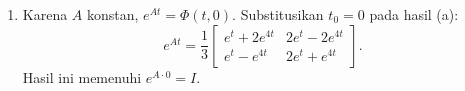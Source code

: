 \documentclass[11pt,a4paper]{article}
\begin{document}
\begin{enumerate}[itemsep=12pt,parsep=5pt]
\begin{enumerate}
                Untuk waktu awal $t_0$, matriks transisinya adalah
                \begin{align*}
                  \Phi(t,t_0)
                    &=F(t)F(t_0)^{-1}\\
                    &=P\begin{bmatrix}e^{t-t_0}&0\\0&e^{4(t-t_0)}\end{bmatrix}P^{-1}.
                \end{align*}
                Tuliskan $\Delta=t-t_0$.
                Setelah perkalian matriks, diperoleh
                \[
                  \Phi(t,t_0)=\frac13\begin{bmatrix}
                    e^{\Delta}+2e^{4\Delta}&2e^{\Delta}-2e^{4\Delta}\\
                    e^{\Delta}-e^{4\Delta}&2e^{\Delta}+e^{4\Delta}
                  \end{bmatrix}.
                \]
                Untuk $t=t_0$, berlaku $\Phi(t_0,t_0)=I$.

          \item Karena $A$ konstan, $e^{At}=\Phi(t,0)$.
                Substitusikan $t_0=0$ pada hasil (a):
                \[
                  e^{At}=\frac13\begin{bmatrix}
                    e^t+2e^{4t}&2e^t-2e^{4t}\\
                    e^t-e^{4t}&2e^t+e^{4t}
                  \end{bmatrix}.
                \]
                Hasil ini memenuhi $e^{A\cdot0}=I$.


\end{enumerate}
\end{enumerate}
\end{document}
